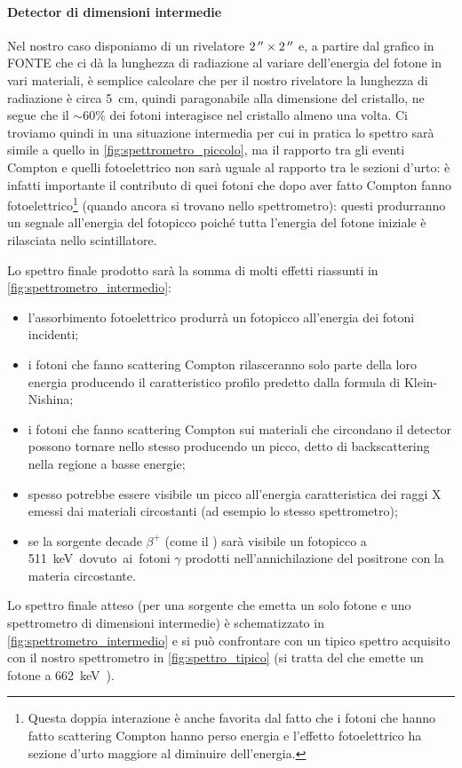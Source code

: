  \paragraph{Detector di dimensioni intermedie}\label{par:spettrometro_intermedio}
 Nel nostro caso disponiamo di un rivelatore $\SI2{''}\times\SI2{''}$ e, a partire dal grafico in FONTE
 che ci dà la lunghezza di radiazione al variare dell'energia del fotone in vari materiali, è semplice calcolare che per il nostro rivelatore la lunghezza di radiazione è circa \SI{5}{cm}, quindi paragonabile alla dimensione del cristallo, ne segue che il $\sim \SI{60}\%$ dei fotoni interagisce nel cristallo almeno una volta. Ci troviamo quindi in una situazione intermedia per cui in pratica lo spettro sarà simile a quello in \autoref{fig:spettrometro_piccolo}, ma il rapporto tra gli eventi Compton e quelli fotoelettrico non sarà uguale al rapporto tra le sezioni d'urto: è infatti importante il contributo di quei fotoni che dopo aver fatto Compton fanno fotoelettrico\footnote{Questa doppia interazione è anche favorita dal fatto che i fotoni che hanno fatto scattering Compton hanno perso energia e l'effetto fotoelettrico ha sezione d'urto maggiore al diminuire dell'energia.} (quando ancora si trovano nello spettrometro): questi produrranno un segnale all'energia del fotopicco poiché tutta l'energia del fotone iniziale è rilasciata nello scintillatore. 
 
 Lo spettro finale prodotto sarà la somma di molti effetti riassunti in \autoref{fig:spettrometro_intermedio}:
 \begin{itemize}
 	\item l'assorbimento fotoelettrico produrrà un fotopicco all'energia dei fotoni incidenti;
 	\item i fotoni che fanno scattering Compton rilasceranno solo parte della loro energia producendo il caratteristico profilo predetto dalla  formula di Klein-Nishina;
 	\item i fotoni che fanno scattering Compton sui materiali che circondano il detector possono tornare nello stesso producendo un picco, detto di backscattering nella regione a basse energie;
 	\item spesso potrebbe essere visibile un picco all'energia caratteristica dei raggi X emessi dai materiali circostanti (ad esempio lo stesso spettrometro);
 	\item se la sorgente decade $\beta^+$ (come il \na) sarà visibile un fotopicco a \SI{511}keV dovuto ai fotoni $\gamma$ prodotti nell'annichilazione del positrone con la materia circostante.
 \end{itemize}
Lo spettro finale atteso (per una sorgente che emetta un solo fotone e uno spettrometro di dimensioni intermedie) è schematizzato in \autoref{fig:spettrometro_intermedio} e si può confrontare con un tipico spettro acquisito con il nostro spettrometro in \autoref{fig:spettro_tipico} (si tratta del \cs\; che emette un fotone a \SI{662}keV).

